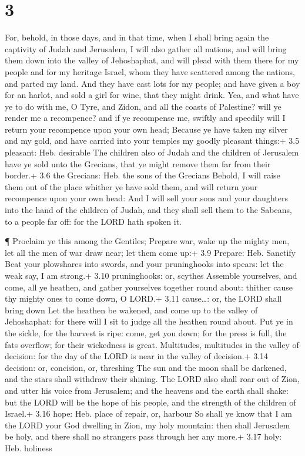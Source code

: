 \hypertarget{section-2}{%
\section{3}\label{section-2}}

 For, behold, in those days, and in that time, when I shall
bring again the captivity of Judah and Jerusalem,  I will
also gather all nations, and will bring them down into the valley of
Jehoshaphat, and will plead with them there for my people and for my
heritage Israel, whom they have scattered among the nations, and parted
my land.  And they have cast lots for my people; and have
given a boy for an harlot, and sold a girl for wine, that they might
drink.  Yea, and what have ye to do with me, O Tyre, and
Zidon, and all the coasts of Palestine? will ye render me a recompence?
and if ye recompense me, swiftly and speedily will I return your
recompence upon your own head;  Because ye have taken my
silver and my gold, and have carried into your temples my goodly
pleasant things:+ 3.5 pleasant: Heb. desirable  The children
also of Judah and the children of Jerusalem have ye sold unto the
Grecians, that ye might remove them far from their border.+ 3.6 the
Grecians: Heb. the sons of the Grecians  Behold, I will
raise them out of the place whither ye have sold them, and will return
your recompence upon your own head:  And I will sell your
sons and your daughters into the hand of the children of Judah, and they
shall sell them to the Sabeans, to a people far off: for the LORD hath
spoken it.

 ¶ Proclaim ye this among the Gentiles; Prepare war, wake up
the mighty men, let all the men of war draw near; let them come up:+ 3.9
Prepare: Heb. Sanctify  Beat your plowshares into swords,
and your pruninghooks into spears: let the weak say, I am strong.+ 3.10
pruninghooks: or, scythes  Assemble yourselves, and come,
all ye heathen, and gather yourselves together round about: thither
cause thy mighty ones to come down, O LORD.+ 3.11 cause\ldots: or, the
LORD shall bring down  Let the heathen be wakened, and come
up to the valley of Jehoshaphat: for there will I sit to judge all the
heathen round about.  Put ye in the sickle, for the harvest
is ripe: come, get you down; for the press is full, the fats overflow;
for their wickedness is great.  Multitudes, multitudes in
the valley of decision: for the day of the LORD is near in the valley of
decision.+ 3.14 decision: or, concision, or, threshing  The
sun and the moon shall be darkened, and the stars shall withdraw their
shining.  The LORD also shall roar out of Zion, and utter
his voice from Jerusalem; and the heavens and the earth shall shake: but
the LORD will be the hope of his people, and the strength of the
children of Israel.+ 3.16 hope: Heb. place of repair, or, harbour
 So shall ye know that I am the LORD your God dwelling in
Zion, my holy mountain: then shall Jerusalem be holy, and there shall no
strangers pass through her any more.+ 3.17 holy: Heb. holiness

